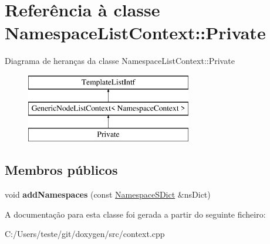 \hypertarget{class_namespace_list_context_1_1_private}{\section{Referência à classe Namespace\-List\-Context\-:\-:Private}
\label{class_namespace_list_context_1_1_private}
}
Diagrama de heranças da classe Namespace\-List\-Context\-:\-:Private\begin{figure}[H]
\begin{center}
\leavevmode
\includegraphics[height=3.000000cm]{class_namespace_list_context_1_1_private}
\end{center}
\end{figure}
\subsection*{Membros públicos}
\begin{DoxyCompactItemize}
\item 
\hypertarget{class_namespace_list_context_1_1_private_a54d5ca2e30be407f54f8d7d055e71dd9}{void {\bfseries add\-Namespaces} (const \hyperlink{class_namespace_s_dict}{Namespace\-S\-Dict} \&ns\-Dict)}\label{class_namespace_list_context_1_1_private_a54d5ca2e30be407f54f8d7d055e71dd9}

\end{DoxyCompactItemize}


A documentação para esta classe foi gerada a partir do seguinte ficheiro\-:\begin{DoxyCompactItemize}
\item 
C\-:/\-Users/teste/git/doxygen/src/context.\-cpp\end{DoxyCompactItemize}
